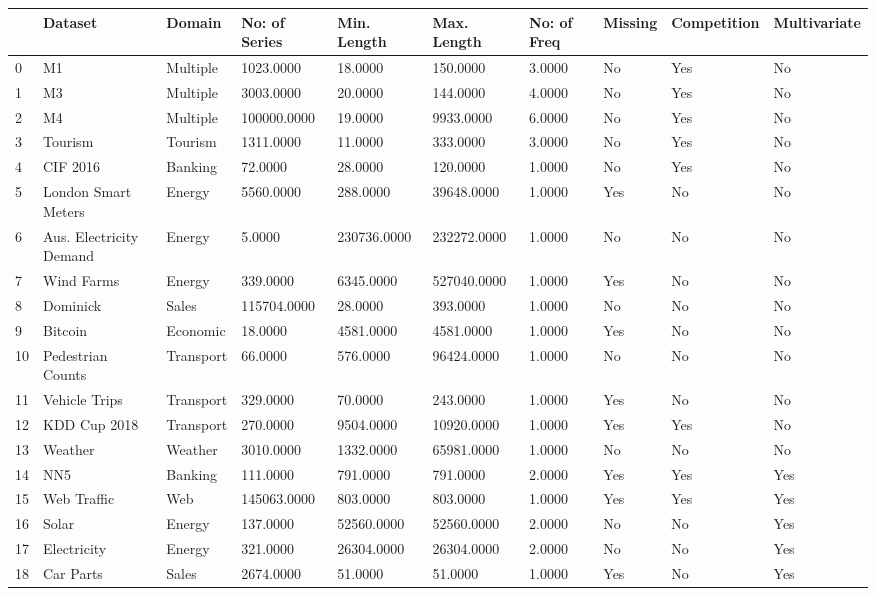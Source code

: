 \begin{tabular}{llllllllll}
\toprule
 & Dataset & Domain & No: of Series & Min. Length & Max. Length & No: of Freq & Missing & Competition & Multivariate \\
\midrule
0 & M1 & Multiple & 1023.0000 & 18.0000 & 150.0000 & 3.0000 & No & Yes & No \\
1 & M3 & Multiple & 3003.0000 & 20.0000 & 144.0000 & 4.0000 & No & Yes & No \\
2 & M4 & Multiple & 100000.0000 & 19.0000 & 9933.0000 & 6.0000 & No & Yes & No \\
3 & Tourism & Tourism & 1311.0000 & 11.0000 & 333.0000 & 3.0000 & No & Yes & No \\
4 & CIF 2016 & Banking & 72.0000 & 28.0000 & 120.0000 & 1.0000 & No & Yes & No \\
5 & London Smart Meters & Energy & 5560.0000 & 288.0000 & 39648.0000 & 1.0000 & Yes & No & No \\
6 & Aus. Electricity Demand & Energy & 5.0000 & 230736.0000 & 232272.0000 & 1.0000 & No & No & No \\
7 & Wind Farms & Energy & 339.0000 & 6345.0000 & 527040.0000 & 1.0000 & Yes & No & No \\
8 & Dominick & Sales & 115704.0000 & 28.0000 & 393.0000 & 1.0000 & No & No & No \\
9 & Bitcoin & Economic & 18.0000 & 4581.0000 & 4581.0000 & 1.0000 & Yes & No & No \\
10 & Pedestrian Counts & Transport & 66.0000 & 576.0000 & 96424.0000 & 1.0000 & No & No & No \\
11 & Vehicle Trips & Transport & 329.0000 & 70.0000 & 243.0000 & 1.0000 & Yes & No & No \\
12 & KDD Cup 2018 & Transport & 270.0000 & 9504.0000 & 10920.0000 & 1.0000 & Yes & Yes & No \\
13 & Weather & Weather & 3010.0000 & 1332.0000 & 65981.0000 & 1.0000 & No & No & No \\
14 & NN5 & Banking & 111.0000 & 791.0000 & 791.0000 & 2.0000 & Yes & Yes & Yes \\
15 & Web Traffic & Web & 145063.0000 & 803.0000 & 803.0000 & 1.0000 & Yes & Yes & Yes \\
16 & Solar & Energy & 137.0000 & 52560.0000 & 52560.0000 & 2.0000 & No & No & Yes \\
17 & Electricity & Energy & 321.0000 & 26304.0000 & 26304.0000 & 2.0000 & No & No & Yes \\
18 & Car Parts & Sales & 2674.0000 & 51.0000 & 51.0000 & 1.0000 & Yes & No & Yes \\

\end{tabular}
